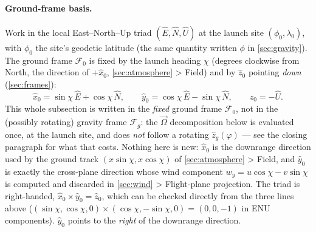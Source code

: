 \paragraph{Ground-frame basis.} Work in the local East--North--Up triad $(\hat{E},\hat{N},\hat{U})$
at the launch site $(\phi_0,\lambda_0)$, with $\phi_0$ the site's geodetic latitude (the same
quantity written $\phi$ in \autoref{sec:gravity}). The ground frame $\mathcal{F}_0$ is fixed by the
launch heading $\chi$ (degrees clockwise from North, the direction of $+\hat{x}_0$,
\autoref{sec:atmosphere} > Field) and by $\hat{z}_0$ pointing \emph{down} (\autoref{sec:frames}):
\begin{equation}
    \hat{x}_0 = \sin\chi\,\hat{E} + \cos\chi\,\hat{N}, \qquad
    \hat{y}_0 = \cos\chi\,\hat{E} - \sin\chi\,\hat{N}, \qquad
    \hat{z}_0 = -\hat{U}.
\end{equation}
This whole subsection is written in the \emph{fixed} ground frame $\mathcal{F}_0$, not in the
(possibly rotating) gravity frame $\mathcal{F}_g$: the $\vec{\Omega}$ decomposition below is
evaluated once, at the launch site, and does \emph{not} follow a rotating $\hat{z}_g(\varphi)$ ---
see the closing paragraph for what that costs. Nothing here is new: $\hat{x}_0$ is the downrange
direction used by the ground track $(x\sin\chi,x\cos\chi)$ of \autoref{sec:atmosphere} > Field,
and $\hat{y}_0$ is exactly the cross-plane direction whose wind component $w_y=u\cos\chi-v\sin\chi$
is computed and discarded in \autoref{sec:wind} > Flight-plane projection. The triad is
right-handed, $\hat{x}_0\times\hat{y}_0=\hat{z}_0$, which can be checked directly from the three
lines above ($(\sin\chi,\cos\chi,0)\times(\cos\chi,-\sin\chi,0)=(0,0,-1)$ in ENU components).
$\hat{y}_0$ points to the \emph{right} of the downrange direction.


